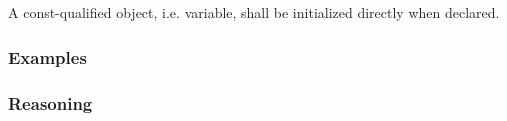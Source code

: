 \subsection*{\codingRule{}}

A const-qualified object, i.e. variable, shall be initialized directly when declared.

\subsubsection*{Examples}

\noindent
\begin{minipage}[t]{\codelstwidth\linewidth}
    
\end{minipage}
\hfill
\begin{minipage}[t]{\codelstwidth\linewidth}
    
\end{minipage}

\subsubsection*{Reasoning}



